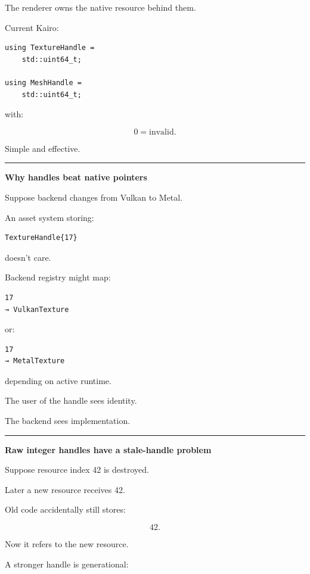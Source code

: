 The renderer owns the native resource behind them.

Current Kairo:

\begin{verbatim}
using TextureHandle =
    std::uint64_t;

using MeshHandle =
    std::uint64_t;
\end{verbatim}

with:

\[
0=\text{invalid}.
\]

Simple and effective.

\begin{center}\rule{0.5\linewidth}{0.5pt}\end{center}

\textbf{Why handles beat native pointers}

Suppose backend changes from Vulkan to Metal.

An asset system storing:

\begin{verbatim}
TextureHandle{17}
\end{verbatim}

doesn't care.

Backend registry might map:

\begin{verbatim}
17
→ VulkanTexture
\end{verbatim}

or:

\begin{verbatim}
17
→ MetalTexture
\end{verbatim}

depending on active runtime.

The user of the handle sees identity.

The backend sees implementation.

\begin{center}\rule{0.5\linewidth}{0.5pt}\end{center}

\textbf{Raw integer handles have a stale-handle problem}

Suppose resource index 42 is destroyed.

Later a new resource receives 42.

Old code accidentally still stores:

\[
42.
\]

Now it refers to the new resource.

A stronger handle is generational:

